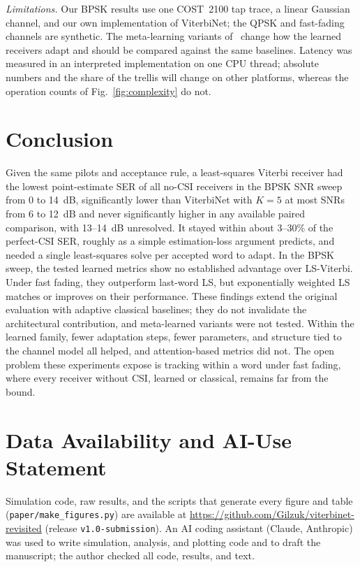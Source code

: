 \documentclass[journal]{IEEEtran}
\begin{document}
\emph{Limitations.} Our BPSK results use one COST~2100 tap trace, a linear Gaussian channel, and our own implementation of ViterbiNet; the QPSK and fast-fading channels are synthetic. The meta-learning variants of~\cite{raviv2021metaviterbinet,raviv2023online} change how the learned receivers adapt and should be compared against the same baselines. Latency was measured in an interpreted implementation on one CPU thread; absolute numbers and the share of the trellis will change on other platforms, whereas the operation counts of Fig.~\ref{fig:complexity} do not.

\section{Conclusion}
Given the same pilots and acceptance rule, a least-squares Viterbi receiver had the lowest point-estimate SER of all no-CSI receivers in the BPSK SNR sweep from 0 to 14~dB, significantly lower than ViterbiNet with $K=5$ at most SNRs from 6 to 12~dB and never significantly higher in any available paired comparison, with 13--14~dB unresolved. It stayed within about 3--30\% of the perfect-CSI SER, roughly as a simple estimation-loss argument predicts, and needed a single least-squares solve per accepted word to adapt. In the BPSK sweep, the tested learned metrics show no established advantage over LS-Viterbi. Under fast fading, they outperform last-word LS, but exponentially weighted LS matches or improves on their performance. These findings extend the original evaluation with adaptive classical baselines; they do not invalidate the architectural contribution, and meta-learned variants were not tested. Within the learned family, fewer adaptation steps, fewer parameters, and structure tied to the channel model all helped, and attention-based metrics did not. The open problem these experiments expose is tracking within a word under fast fading, where every receiver without CSI, learned or classical, remains far from the bound.

\section*{Data Availability and AI-Use Statement}
Simulation code, raw results, and the scripts that generate every figure and table (\texttt{paper/make\_figures.py}) are available at \url{https://github.com/Gilzuk/viterbinet-revisited} (release \texttt{v1.0-submission}). An AI coding assistant (Claude, Anthropic) was used to write simulation, analysis, and plotting code and to draft the manuscript; the author checked all code, results, and text.



\end{document}
